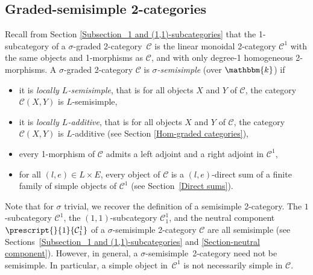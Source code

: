 \documentclass[a4paper, oneside]{amsart}
\numberwithin{equation}{subsection}
\theoremstyle{referencedlemma}
\theoremstyle{plain} %
\theoremstyle{remark}
\begin{document}
\subsection{Graded-semisimple 2-categories}\label{Section_Graded-semisimple 2-categories} Recall from Section \ref{Subsection_1 and (1,1)-subcategories} that the 1-subcategory of a $\sigma$-graded \mbox{2-cate}\-gory~$\mathcal{C}$ is the linear monoidal 2-category $\mathcal{C}^1$ with the same objects and 1-morphisms as $\mathcal{C}$, and with only degree-1 homogeneous 2-morphisms.  A $\sigma$-graded 2-category $\mathcal{C}$ is \emph{$\sigma$-semisimple} (over $\mathbbm{k}$) if 
\begin{itemize}
\item it is \emph{locally $L$-semisimple}, that is for all objects $X$ and $Y$ of $\mathcal{C}$, the category $\mathcal{C}(X,Y)$ is $L$-semisimple,
\item it is \emph{locally $L$-additive}, that is for all objects $X$ and $Y$ of $\mathcal{C}$, the category $\mathcal{C}(X,Y)$ is $L$-additive (see Section \ref{Hom-graded categories}),
\item every 1-morphism of $\mathcal{C}$ admits a left adjoint and a right adjoint in $\mathcal{C}^1$,
\item for all $(l,e)\in L\times E$, every object of $\mathcal{C}$ is a $(l,e)$-direct sum of a finite family of simple objects of $\mathcal{C}^1$ (see Section~\ref{Direct sums}). 
\end{itemize}
Note that for $\sigma$ trivial, we recover the definition of a semisimple 2-category.  The $1$-subcategory $\mathcal{C}^1$, the $(1,1)$-subcategory $\mathcal{C}_1^1$, and the neutral component $\prescript{}{1}{\mathcal{C}_1^1}$ of a $\sigma$-semisimple 2-category $\mathcal{C}$ are all semisimple (see Sections~\ref{Subsection_1 and (1,1)-subcategories} and \ref{Section-neutral component}).  However,  in general, a $\sigma$-semisimple~2-category need not be semisimple.  In particular, a simple object in~$\mathcal{C}^1$ is not necessarily simple in $\mathcal{C}$.  
\end{document}

